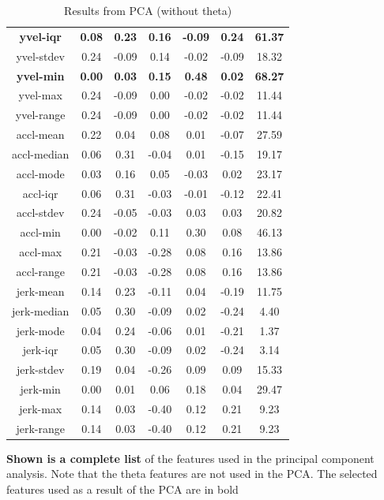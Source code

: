 \begin{table}[h!]
\begin{tabular}{|c|c|c|c|c|c|c|}
		\textbf{yvel-iqr} & \textbf{0.08} & \textbf{0.23} & \textbf{0.16} & \textbf{-0.09} & \textbf{0.24} & \textbf{61.37} \\
		yvel-stdev & 0.24 & -0.09 & 0.14 & -0.02 & -0.09 & 18.32 \\
		\textbf{yvel-min} & \textbf{0.00} & \textbf{0.03} & \textbf{0.15} & \textbf{0.48} & \textbf{0.02} & \textbf{68.27} \\
		yvel-max & 0.24 & -0.09 & 0.00 & -0.02 & -0.02 & 11.44 \\
		yvel-range & 0.24 & -0.09 & 0.00 & -0.02 & -0.02 & 11.44 \\
		accl-mean & 0.22 & 0.04 & 0.08 & 0.01 & -0.07 & 27.59 \\
		accl-median & 0.06 & 0.31 & -0.04 & 0.01 & -0.15 & 19.17 \\
		accl-mode & 0.03 & 0.16 & 0.05 & -0.03 & 0.02 & 23.17 \\
		accl-iqr & 0.06 & 0.31 & -0.03 & -0.01 & -0.12 & 22.41 \\
		accl-stdev & 0.24 & -0.05 & -0.03 & 0.03 & 0.03 & 20.82 \\
		accl-min & 0.00 & -0.02 & 0.11 & 0.30 & 0.08 & 46.13 \\
		accl-max & 0.21 & -0.03 & -0.28 & 0.08 & 0.16 & 13.86 \\
		accl-range & 0.21 & -0.03 & -0.28 & 0.08 & 0.16 & 13.86 \\
		jerk-mean & 0.14 & 0.23 & -0.11 & 0.04 & -0.19 & 11.75 \\
		jerk-median & 0.05 & 0.30 & -0.09 & 0.02 & -0.24 & 4.40 \\
		jerk-mode & 0.04 & 0.24 & -0.06 & 0.01 & -0.21 & 1.37 \\
		jerk-iqr & 0.05 & 0.30 & -0.09 & 0.02 & -0.24 & 3.14 \\
		jerk-stdev & 0.19 & 0.04 & -0.26 & 0.09 & 0.09 & 15.33 \\
		jerk-min & 0.00 & 0.01 & 0.06 & 0.18 & 0.04 & 29.47 \\
		jerk-max & 0.14 & 0.03 & -0.40 & 0.12 & 0.21 & 9.23 \\
		jerk-range & 0.14 & 0.03 & -0.40 & 0.12 & 0.21 & 9.23 \\
		\hline
	\end{tabular}
	\caption{Results from PCA (without theta)}
	{\small \textbf{Shown is a complete list} of the features used in the principal component analysis. Note that the theta features are not used in the PCA. The selected features used as a result of the PCA are in bold}
	\label{tab:pca-without-theta-results}
\end{table}

